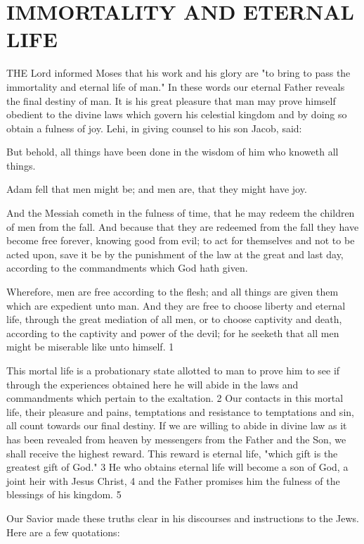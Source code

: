 \chapter{IMMORTALITY AND ETERNAL LIFE}

THE Lord informed Moses that his work and his glory are "to bring to pass the immortality
and eternal life of man." In these words our eternal Father reveals the final destiny of man. It
is his great pleasure that man may prove himself obedient to the divine laws which govern
his celestial kingdom and by doing so obtain a fulness of joy. Lehi, in giving counsel to his
son Jacob, said:

But behold, all things have been done in the wisdom of him who knoweth all things.

Adam fell that men might be; and men are, that they might have joy.

And the Messiah cometh in the fulness of time, that he may redeem the children of men from
the fall. And because that they are redeemed from the fall they have become free forever,
knowing good from evil; to act for themselves and not to be acted upon, save it be by the
punishment of the law at the great and last day, according to the commandments which God
hath given.

Wherefore, men are free according to the flesh; and all things are given them which are
expedient unto man. And they are free to choose liberty and eternal life, through the great
mediation of all men, or to choose captivity and death, according to the captivity and power
of the devil; for he seeketh that all men might be miserable like unto himself. 1

This mortal life is a probationary state allotted to man to prove him to see if through the
experiences obtained here he will abide in the laws and commandments which pertain to the
exaltation. 2 Our contacts in this mortal life, their pleasure and pains, temptations and
resistance to temptations and sin, all count towards our final destiny. If we are willing to
abide in divine law as it has been revealed from heaven by messengers from the Father and
the Son, we shall receive the highest reward. This reward is eternal life, "which gift is the
greatest gift of God." 3 He who obtains eternal life will become a son of God, a joint heir
with Jesus Christ, 4 and the Father promises him the fulness of the blessings of his kingdom.
5

Our Savior made these truths clear in his discourses and instructions to the Jews. Here are a
few quotations:


